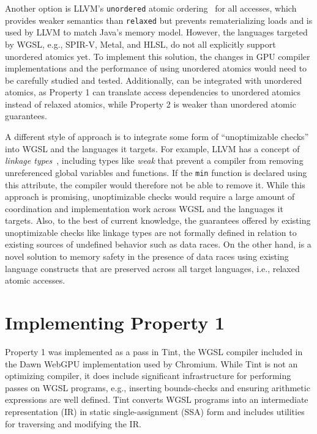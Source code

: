Another option is LLVM's \texttt{unordered} atomic ordering~\cite[Atomic Memory Ordering Constraints]{LLVM_LangRef} for all accesses, which provides weaker semantics than \texttt{relaxed} but prevents rematerializing loads and is used by LLVM to match Java's memory model. However, the languages targeted by WGSL, e.g., SPIR-V, Metal, and HLSL, do not all explicitly support unordered atomics yet. To implement this solution, the changes in GPU compiler implementations and the performance of using unordered atomics would need to be carefully studied and tested. Additionally, \smsg can be integrated with unordered atomics, as Property 1 can translate access dependencies to unordered atomics instead of relaxed atomics, while Property 2 is weaker than unordered atomic guarantees.

A different style of approach is to integrate some form of ``unoptimizable checks'' into WGSL and the languages it targets. For example, LLVM has a concept of \textit{linkage types}~\cite[Linkage Types]{LLVM_LangRef}, including types like \textit{weak} that prevent a compiler from removing unreferenced global variables and functions. If the \texttt{min} function is declared using this attribute, the compiler would therefore not be able to remove it. While this approach is promising, unoptimizable checks would require a large amount of coordination and implementation work across WGSL and the languages it targets. Also, to the best of current knowledge, the guarantees offered by existing unoptimizable checks like linkage types are not formally defined in relation to existing sources of undefined behavior such as data races. On the other hand, \smsg is a novel solution to memory safety in the presence of data races using existing language constructs that are preserved across all target languages, i.e., relaxed atomic accesses.

\section{Implementing \smsg Property 1 \label{sec:saferace-smsg-prop-1}}

Property 1 was implemented as a pass in Tint, the WGSL compiler included in the Dawn WebGPU implementation used by Chromium. While Tint is not an optimizing compiler, it does include significant infrastructure for performing passes on WGSL programs, e.g., inserting bounds-checks and ensuring arithmetic expressions are well defined. Tint converts WGSL programs into an intermediate representation (IR) in static single-assignment (SSA) form and includes utilities for traversing and modifying the IR.

